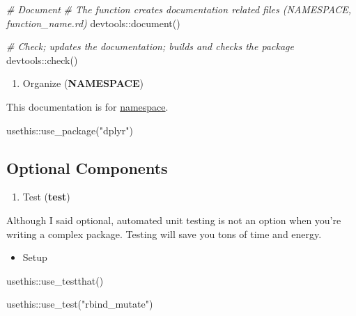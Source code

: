\documentclass[
]{book}
\newenvironment{Shaded}{\begin{snugshade}}{\end{snugshade}}
\newcommand{\CommentTok}[1]{\textcolor[rgb]{0.56,0.35,0.01}{\textit{#1}}}
\newcommand{\FunctionTok}[1]{\textcolor[rgb]{0.00,0.00,0.00}{#1}}
\newcommand{\NormalTok}[1]{#1}
\newcommand{\SpecialCharTok}[1]{\textcolor[rgb]{0.00,0.00,0.00}{#1}}
\newcommand{\StringTok}[1]{\textcolor[rgb]{0.31,0.60,0.02}{#1}}
\providecommand{\tightlist}{%
  \setlength{\itemsep}{0pt}\setlength{\parskip}{0pt}}
\begin{document}
\begin{Shaded}
\begin{Highlighting}[]
\CommentTok{\# Document }
\CommentTok{\# The function creates documentation related files (NAMESPACE, function\_name.rd)}
\NormalTok{devtools}\SpecialCharTok{::}\FunctionTok{document}\NormalTok{()}

\CommentTok{\# Check; updates the documentation; builds and checks the package }
\NormalTok{devtools}\SpecialCharTok{::}\FunctionTok{check}\NormalTok{()}
\end{Highlighting}
\end{Shaded}

\begin{enumerate}
\def\labelenumi{\arabic{enumi}.}
\setcounter{enumi}{3}
\tightlist
\item
  Organize (\textbf{NAMESPACE})
\end{enumerate}

This documentation is for \href{https://en.wikipedia.org/wiki/Namespace}{namespace}.

\begin{Shaded}
\begin{Highlighting}[]
\NormalTok{usethis}\SpecialCharTok{::}\FunctionTok{use\_package}\NormalTok{(}\StringTok{"dplyr"}\NormalTok{)}
\end{Highlighting}
\end{Shaded}

\hypertarget{optional-components}{%
\subsection{Optional Components}\label{optional-components}}

\begin{enumerate}
\def\labelenumi{\arabic{enumi}.}
\tightlist
\item
  Test (\textbf{test})
\end{enumerate}

Although I said optional, automated unit testing is not an option when you're writing a complex package. Testing will save you tons of time and energy.

\begin{itemize}
\tightlist
\item
  Setup
\end{itemize}

\begin{Shaded}
\begin{Highlighting}[]
\NormalTok{usethis}\SpecialCharTok{::}\FunctionTok{use\_testthat}\NormalTok{()}

\NormalTok{usethis}\SpecialCharTok{::}\FunctionTok{use\_test}\NormalTok{(}\StringTok{"rbind\_mutate"}\NormalTok{)}
\end{Highlighting}
\end{Shaded}
\end{document}
